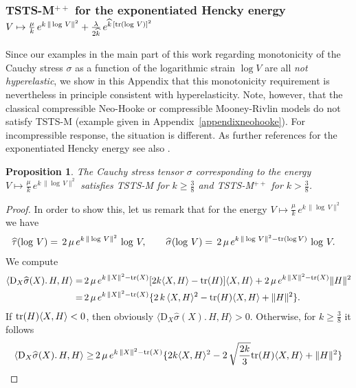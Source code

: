 \documentclass[10pt]{article}
\newcounter{theoremCounter}
\numberwithin{theoremCounter}{section}
\theoremstyle{plain}
\newtheorem{prop}[theoremCounter]{Proposition}
\theoremstyle{definition}
\newcommand{\DD}{\mathrm{D}}
\DeclareMathOperator{\tr}{tr}
\def\tr{\textnormal{tr}}
\numberwithin{equation}{section}
\begin{document}
\begin{appendix}
\subsubsection{TSTS-M$^{++}$ for the exponentiated Hencky energy $V\mapsto \frac{\mu}{k}\,e^{k\,\|\log\,V\|^2}+\frac{\lambda}{2\widehat{k}}\,e^{\widehat{k}\,[{\rm tr}
(\log\,V)]^2}$}
%
Since our examples in the main part of this work regarding monotonicity of the Cauchy stress $\sigma$ as a function of the logarithmic strain $\log V$ are all \emph{not hyperelastic}, we show in this Appendix that this monotonicity requirement is nevertheless in principle consistent with hyperelasticity. Note, however, that the classical compressible Neo-Hooke or compressible Mooney-Rivlin models do not satisfy TSTS-M (example given in Appendix~\ref{appendixneohooke}). For incompressible response, the situation is different. As further references for the exponentiated Hencky energy see also \cite{montella2016, nedjar2018, xiao2002}.
%
\begin{prop}
 The Cauchy stress tensor $\sigma$ corresponding to the energy $V\mapsto \frac{\mu}{k}\,e^{k\,\|\log\,V\|^2}$ satisfies TSTS-M  for $k\geq \frac{3}{8}$ and
 TSTS-M$^{++}$  for $k> \frac{3}{8}$.
 \end{prop}
%
 \begin{proof}
 In order to show this, let us remark that  for the energy $V\mapsto \frac{\mu}{k}\,e^{k\,\|\log\,V\|^2}$ we have
	 \begin{align}\label{eqsigmataut}
	 \widehat{\tau}(\log\,V)&=\,2\,{\mu}\,e^{k\,\|\log\,V\|^2}\, \log\,V,\qquad
	  \widehat{\sigma}(\log\,V)=\,2\,{\mu}\,e^{k\,\|\log\,V\|^2-\tr(\log  V)}\, \log\,V.
	 \end{align}
  We compute
	 \begin{align}
	 \langle \DD_{X}\widehat{\sigma}(X).\,H,H\rangle=&\,2\,{\mu}\,e^{k\,\| X\|^2-\tr(X)}[2k\langle  X,H\rangle-\tr(H)]\langle
	 X,H\rangle\notag+2\,{\mu}\,e^{k\,\|X\|^2-\tr(X)}\| H\|^2\notag\\
	 =&\,2\,{\mu}\,e^{k\,\| X\|^2-\tr(X)}\{2\,k\,\langle  X,H\rangle^2-\tr(H)\langle  X,H\rangle+\| H\|^2\}.
	\end{align}
If $\tr(H)\langle  X,H\rangle<0$, then obviously $\langle \DD_{X}\widehat{\sigma}(X).\,H,H\rangle>0$. Otherwise, for $k\geq \frac{3}{8}$ it follows
	\begin{align}
	 \langle \DD_{X}\widehat{\sigma}(X).\,H,H\rangle\geq &\,2\,{\mu}\,e^{k\,\| X\|^2-\tr(X)}\{2k\langle  X,H\rangle^2-2\,\sqrt{\frac{2k}{3}}\tr(H)\langle
	 X,H\rangle+\| H\|^2\}\\

\end{align}
\end{proof}
\end{appendix}
\end{document}
